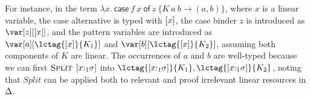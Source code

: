 \documentclass[acmsmall,review,anonymous,screen]{acmart}
\newcommand{\ccase}[2]{\mathsf{case}~#1~\mathsf{of}~#2}
\begin{document}
For instance, in the term $\lambda x.~\ccase{f~x}{z~\{K~a~b\to
  (a,b)\}}$, where $x$ is a linear variable, the case alternative is
typed with $\left[x\right]$,
the case binder $z$ is introduced as $\z[\irr{x}]$, and the pattern variables
are introduced as $\var[a][\lctag{\irr{x}}{K_1}]$ and
$\var[b][\lctag{\irr{x}}{K_2}]$, assuming both components of $K$ are linear.
%
The occurrences of $a$ and $b$ are well-typed because we can first
$\textsc{Split}$ $[x{:}_1\sigma]$ into $\lctag{[x{:}_1\s]}{K_1}, \lctag{[x{:}_1\s]}{K_2}$,
%
%
noting that $Split$ can be applied both to relevant and proof irrelevant linear
resources in $\Delta$.

\end{document}
